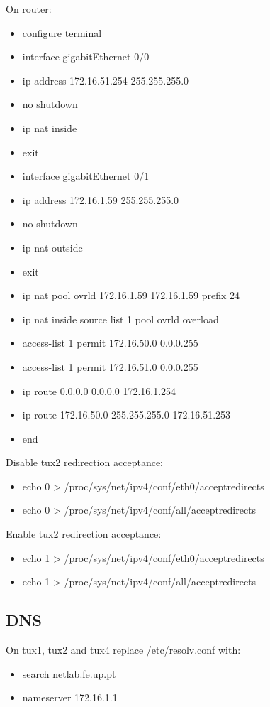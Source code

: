 \documentclass[11pt,a4paper,reqno]{article}
\numberwithin{equation}{section}
\begin{document}
\begin{appendices}
On router:

\begin{itemize}[label=-]
\item configure terminal
\item interface gigabitEthernet 0/0
\item ip address 172.16.51.254 255.255.255.0
\item no shutdown
\item ip nat inside
\item exit
\item interface gigabitEthernet 0/1
\item ip address 172.16.1.59 255.255.255.0
\item no shutdown
\item ip nat outside
\item exit
\item ip nat pool ovrld 172.16.1.59 172.16.1.59 prefix 24
\item ip nat inside source list 1 pool ovrld overload
\item access-list 1 permit 172.16.50.0 0.0.0.255
\item access-list 1 permit 172.16.51.0 0.0.0.255
\item ip route 0.0.0.0 0.0.0.0 172.16.1.254
\item ip route 172.16.50.0 255.255.255.0 172.16.51.253
\item end
\end{itemize}

Disable tux2 redirection acceptance:

\begin{itemize}[label=-]
\item echo 0 > /proc/sys/net/ipv4/conf/eth0/accept\textunderscore redirects
\item echo 0 > /proc/sys/net/ipv4/conf/all/accept\textunderscore redirects 
\end{itemize}

Enable tux2 redirection acceptance:

\begin{itemize}[label=-]
\item echo 1 > /proc/sys/net/ipv4/conf/eth0/accept\textunderscore redirects
\item echo 1 > /proc/sys/net/ipv4/conf/all/accept\textunderscore redirects
\end{itemize}

\subsection{DNS}

On tux1, tux2 and tux4 replace /etc/resolv.conf with:

\begin{itemize}[label=-]
\item search netlab.fe.up.pt
\item nameserver 172.16.1.1
\end{itemize}


\end{appendices}
\end{document}
